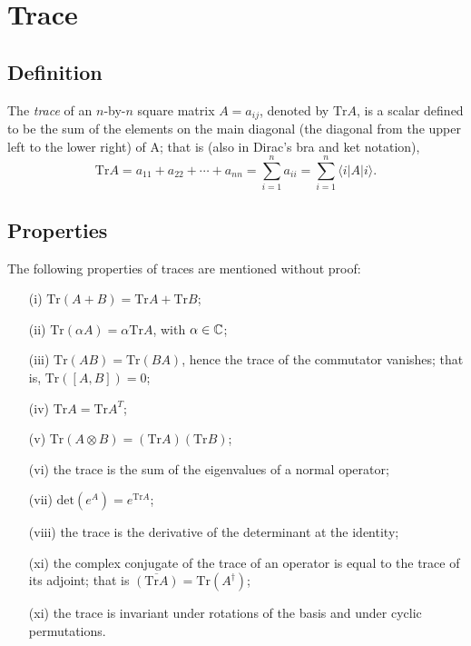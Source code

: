 \section{Trace}

\subsection{Definition}
The {\em trace} of an $n$-by-$n$ square matrix $A=a_{ij}$, denoted by
$\textrm{Tr} A$,  is a scalar
defined to be the sum of the elements on the main diagonal
 (the diagonal from the upper left to the lower right) of A; that is  (also in Dirac's bra and ket notation),
\begin{equation}
\textrm{Tr}A
= a_{11} +a_{22}+ \cdots +a_{nn}
=\sum_{i=1}^n a_{ii}=\sum_{i=1}^n \langle i \vert A\vert i \rangle.
\end{equation}

\subsection{Properties}

The following properties of traces are mentioned without proof:

\begin{itemize}
\item[(i)]
$\textrm{Tr}(A+B)=\textrm{Tr}A+\textrm{Tr}B$;
\item[(ii)]
$\textrm{Tr}(\alpha A)= \alpha \textrm{Tr}A$, with $\alpha \in {\Bbb C}$;
\item[(iii)]
$\textrm{Tr}(AB) = \textrm{Tr}(BA)$, hence the trace of the  commutator vanishes; that
is, $\textrm{Tr}([A,B])=0$;
\item[(iv)]
$\textrm{Tr}A = \textrm{Tr}A^T$;
\item[(v)]
$\textrm{Tr}(A\otimes B)= (\textrm{Tr}A) (\textrm{Tr}B)$;
\item[(vi)]
the trace is the sum of the eigenvalues of a normal operator;
\item[(vii)]
$ \textrm{det}(e^A)=e^{\textrm{Tr}A} $;
\item[(viii)]
 the trace is the derivative of the determinant at the identity;
\item[(xi)]
the complex conjugate of the trace of an operator is equal to the trace of its adjoint; that is
$\overline{(  \textrm{Tr} A)}=\textrm{Tr} (A^\dagger)$;
\item[(xi)]
the trace is invariant under rotations of the basis and under cyclic permutations.
\end{itemize}


